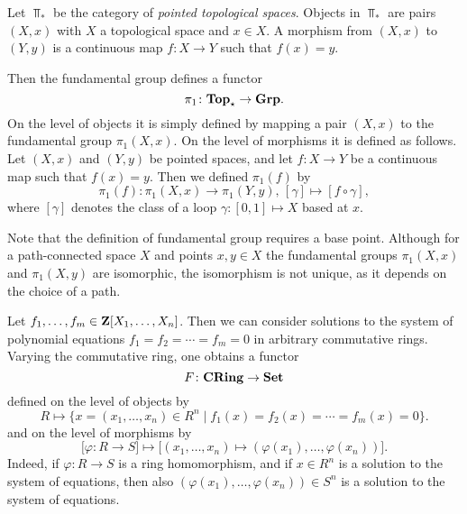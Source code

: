 \begin{example} Let $\Top_\ast$ be the category of \emph{pointed topological spaces}. Objects in $\Top_\ast$ are pairs $(X,x)$ with $X$ a topological space and $x\in X$. A morphism from $(X,x)$ to $(Y,y)$ is a continuous map $f\colon X\to Y$ such that $f(x)=y$.

Then the fundamental group defines a functor
\[
	\pi_1\colon \mathbf{Top}_\star \to \mathbf{Grp}.
\]
On the level of objects it is simply defined by mapping a pair $(X,x)$ to the fundamental group $\pi_1(X,x)$. On the level of morphisms
it is defined as follows. Let $(X,x)$ and $(Y,y)$ be pointed spaces, and let $f \colon X\to Y$ be a continuous map such that $f(x)=y$. Then
we defined $\pi_1(f)$ by
\[
	\pi_1(f) \colon \pi_1(X,x) \to \pi_1(Y,y),\, [\gamma] \mapsto [f\circ \gamma],
\]
where $[\gamma]$ denotes the class of a loop $\gamma\colon [0,1] \mapsto X$ based at $x$.
\end{example} 

Note that the definition of fundamental group requires a base point. Although for a path-connected space $X$ and points $x,y\in X$ the fundamental groups $\pi_1(X,x)$ and $\pi_1(X,y)$ are isomorphic,
the isomorphism is not unique, as it depends on the choice of a path. 


\begin{example}\label{exa:pol-eq}
Let $f_1,\ldots, f_m \in {\mathbf{Z}}[X_1,\ldots, X_n]$. Then we can consider
solutions to the system of polynomial equations $f_1=f_2=\cdots =f_m=0$ in arbitrary commutative rings. Varying the commutative ring, one obtains a functor
\[
	F\colon \mathbf{CRing} \to \mathbf{Set}
\]
defined on the level of objects by  
\[
	R \mapsto \{ x=(x_1,\ldots, x_n) \in R^n \mid f_1(x)=f_2(x)=\cdots =f_m(x) =0 \}.
\]
and on the level of morphisms by 
\[
	\big[ \varphi\colon R\to S\big] \mapsto \big[ (x_1,\ldots,x_n) \mapsto 
	(\varphi(x_1),\ldots,\varphi(x_n))\big].
\]
Indeed, if $\varphi\colon R\to S$ is a ring homomorphism, and if $x\in R^n$ is a solution to the system of equations, then also $(\varphi(x_1),\ldots, \varphi(x_n) ) \in S^n$ is a solution to the system of equations.
\end{example}

